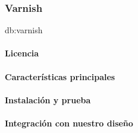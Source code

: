\subsubsection{Varnish}
\label{soa:tecnologias:varnish}

\gls{db:varnish}

\paragraph{Licencia}

\paragraph{Características principales}

\paragraph{Instalación y prueba}

\paragraph{Integración con nuestro diseño}
